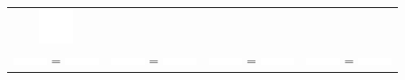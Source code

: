 \documentclass[t, pdftex]{beamer}
\begin{document}
\begin{frame}
\begin{table}[]
\begin{tabular}{cccc}
            \includegraphics[valign=m, width=1cm]{figures/equations/empty.pdf}\\


            \includegraphics[valign=m, width=1cm]{figures/equations/e132.pdf} \color{white}= 
            \includegraphics[valign=m, width=1cm]{figures/equations/e132.pdf} &
            \includegraphics[valign=m, width=1cm]{figures/equations/e132.pdf} \color{white}= 
            \includegraphics[valign=m, width=1cm]{figures/equations/e132.pdf} &

            \includegraphics[valign=m, width=1cm]{figures/equations/e132.pdf} \color{white}= 
            \includegraphics[valign=m, width=1cm]{figures/equations/e132.pdf} &
            \includegraphics[valign=m, width=1cm]{figures/equations/e132.pdf} \color{white}= 
            \includegraphics[valign=m, width=1cm]{figures/equations/e132.pdf} 

        \end{tabular}
    \end{table}
\end{frame}
\end{document}
